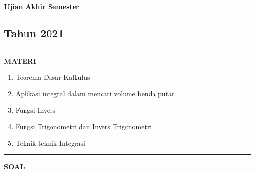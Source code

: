 \newpage
\begin{flushright}
    \textbf{\Large{Ujian Akhir Semester}}
    \subsection*{Tahun 2021}
\end{flushright}
\vspace{0.5cm}
\hrule height 2pt
\vspace{0.5cm}
\begin{center}
    \textbf{\large{MATERI}}
    \begin{enumerate}[leftmargin=*, label={\arabic*}.]
        \item Teorema Dasar Kalkulus
        \item Aplikasi integral dalam mencari volume benda putar
        \item Fungsi Invers
        \item Fungsi Trigonometri dan Invers Trigonometri
        \item Teknik-teknik Integrasi
    \end{enumerate}
\end{center}
\vspace{0.2cm}
\hrule height 1pt
\vspace{0.5cm}
\begin{center}
    \textbf{\large{SOAL}}
\end{center}
